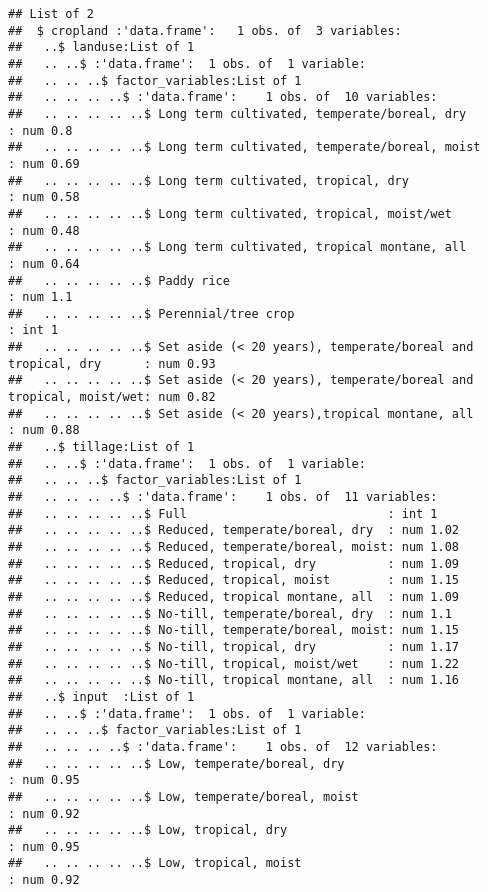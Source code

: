 \documentclass[
]{article}
\begin{document}
\begin{verbatim}
## List of 2
##  $ cropland :'data.frame':   1 obs. of  3 variables:
##   ..$ landuse:List of 1
##   .. ..$ :'data.frame':  1 obs. of  1 variable:
##   .. .. ..$ factor_variables:List of 1
##   .. .. .. ..$ :'data.frame':    1 obs. of  10 variables:
##   .. .. .. .. ..$ Long term cultivated, temperate/boreal, dry                     : num 0.8
##   .. .. .. .. ..$ Long term cultivated, temperate/boreal, moist                   : num 0.69
##   .. .. .. .. ..$ Long term cultivated, tropical, dry                             : num 0.58
##   .. .. .. .. ..$ Long term cultivated, tropical, moist/wet                       : num 0.48
##   .. .. .. .. ..$ Long term cultivated, tropical montane, all                     : num 0.64
##   .. .. .. .. ..$ Paddy rice                                                      : num 1.1
##   .. .. .. .. ..$ Perennial/tree crop                                             : int 1
##   .. .. .. .. ..$ Set aside (< 20 years), temperate/boreal and tropical, dry      : num 0.93
##   .. .. .. .. ..$ Set aside (< 20 years), temperate/boreal and tropical, moist/wet: num 0.82
##   .. .. .. .. ..$ Set aside (< 20 years),tropical montane, all                    : num 0.88
##   ..$ tillage:List of 1
##   .. ..$ :'data.frame':  1 obs. of  1 variable:
##   .. .. ..$ factor_variables:List of 1
##   .. .. .. ..$ :'data.frame':    1 obs. of  11 variables:
##   .. .. .. .. ..$ Full                            : int 1
##   .. .. .. .. ..$ Reduced, temperate/boreal, dry  : num 1.02
##   .. .. .. .. ..$ Reduced, temperate/boreal, moist: num 1.08
##   .. .. .. .. ..$ Reduced, tropical, dry          : num 1.09
##   .. .. .. .. ..$ Reduced, tropical, moist        : num 1.15
##   .. .. .. .. ..$ Reduced, tropical montane, all  : num 1.09
##   .. .. .. .. ..$ No-till, temperate/boreal, dry  : num 1.1
##   .. .. .. .. ..$ No-till, temperate/boreal, moist: num 1.15
##   .. .. .. .. ..$ No-till, tropical, dry          : num 1.17
##   .. .. .. .. ..$ No-till, tropical, moist/wet    : num 1.22
##   .. .. .. .. ..$ No-till, tropical montane, all  : num 1.16
##   ..$ input  :List of 1
##   .. ..$ :'data.frame':  1 obs. of  1 variable:
##   .. .. ..$ factor_variables:List of 1
##   .. .. .. ..$ :'data.frame':    1 obs. of  12 variables:
##   .. .. .. .. ..$ Low, temperate/boreal, dry                                : num 0.95
##   .. .. .. .. ..$ Low, temperate/boreal, moist                              : num 0.92
##   .. .. .. .. ..$ Low, tropical, dry                                        : num 0.95
##   .. .. .. .. ..$ Low, tropical, moist                                      : num 0.92

\end{verbatim}
\end{document}
